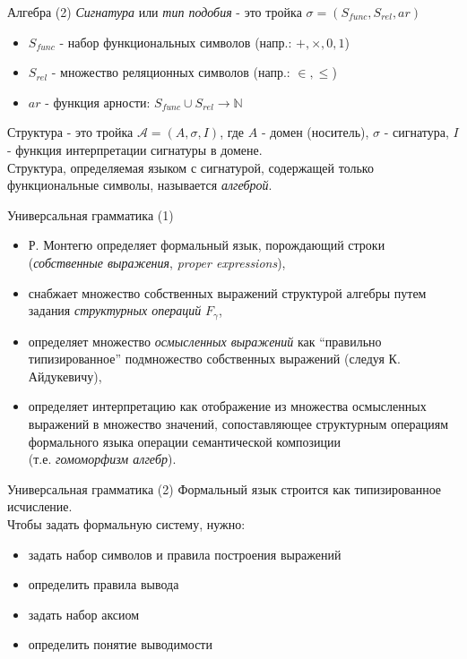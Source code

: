\documentclass{beamer}
\begin{document}
\begin{frame}{Алгебра (2)}
\textit{Сигнатура} или \textit{тип подобия} - это тройка $\sigma = (S_{func}, S_{rel}, ar)$\\
\bigskip
\begin{itemize}
  \item $S_{func}$ - набор функциональных символов (напр.: $+, \times, 0, 1$)
  \item $S_{rel}$ - множество реляционных символов (напр.: $\in, \leq$)
  \item $ar$ - функция арности: $S_{func} \cup S_{rel} \to \mathbb{N}$
\end{itemize}
\bigskip
Структура - это тройка $\mathcal{A} = (A, \sigma, I)$, где $A$ - домен (носитель), $\sigma$ - сигнатура, $I$ - функция интерпретации сигнатуры в домене.\\
\bigskip
Структура, определяемая языком с сигнатурой, содержащей только функциональные символы, называется \textit{алгеброй}.
\end{frame}

\begin{frame}{Универсальная грамматика (1)}
\begin{itemize}
  \item Р. Монтегю определяет формальный язык, порождающий строки (\textit{собственные выражения}, \textit{proper expressions}),
  \item снабжает множество собственных выражений структурой алгебры путем задания \textit{структурных операций} $F_\gamma$,
  \item определяет множество \textit{осмысленных выражений} как ``правильно типизированное'' подмножество собственных выражений (следуя К. Айдукевичу),
  \item определяет интерпретацию как отображение из множества осмысленных выражений в множество значений, сопоставляющее структурным операциям формального языка операции семантической композиции\\ (т.е. \textit{гомоморфизм алгебр}).
\end{itemize}
\end{frame}

\begin{frame}{Универсальная грамматика (2)}
Формальный язык строится как типизированное исчисление.\\
\bigskip
\bigskip
Чтобы задать формальную систему, нужно:\\
\begin{itemize}
  \item задать набор символов и правила построения выражений
  \item определить правила вывода
  \item задать набор аксиом
  \item определить понятие выводимости
\end{itemize}
\end{frame}
\end{document}
